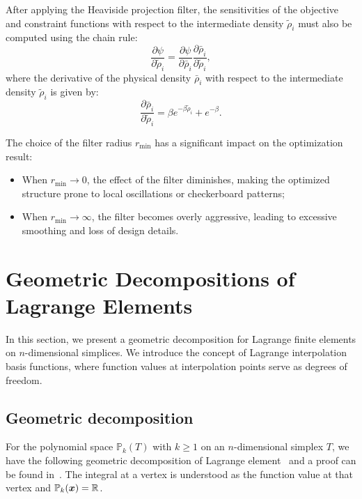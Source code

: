 \documentclass[mathpazo]{cicp}
\begin{document}
After applying the Heaviside projection filter, the sensitivities of the objective and constraint functions with respect to the intermediate density $\tilde{\rho}_i$ must also be computed using the chain rule: 
\begin{equation*}
	\frac{\partial\psi}{\partial\tilde\rho_i} = \frac{\partial\psi}{\partial\bar\rho_i} \frac{\partial\bar\rho_i}{\partial\tilde\rho_i},
\end{equation*} 
where the derivative of the physical density $\bar{\rho}_i$ with respect to the intermediate density $\tilde{\rho}_i$ is given by:
\begin{equation*}
	\frac{\partial\bar\rho_i}{\partial\tilde\rho_i} = \beta{e}^{-\beta\tilde\rho_i} + e^{-\beta}.
\end{equation*}

The choice of the filter radius $r_{\min}$ has a significant impact on the optimization result: 
\begin{itemize} 
	\item When $r_{\min} \to 0$, the effect of the filter diminishes, making the optimized structure prone to local oscillations or checkerboard patterns; 
	\item When $r_{\min} \to \infty$, the filter becomes overly aggressive, leading to excessive smoothing and loss of design details. 
\end{itemize}

\section{Geometric Decompositions of Lagrange Elements}\label{sec:lagrange}
In this section, we present a geometric decomposition for Lagrange finite elements on $n$-dimensional simplices. We introduce the concept of Lagrange interpolation basis functions, where function values at interpolation points serve as degrees of freedom. 

\subsection{Geometric decomposition}
For the polynomial space $\mathbb P_k(T)$ with $k\geq 1$ on an $n$-dimensional simplex $T$, we have the following geometric decomposition of Lagrange element~\cite[(2.6)]{ArnoldFalkWinther2009} and a proof can be found in~\cite{Chen;Huang:2021Geometric}. The integral at a vertex is understood as the function value at that vertex and $\mathbb P_k({\boldsymbol x}) = \mathbb R$.
\end{document}
